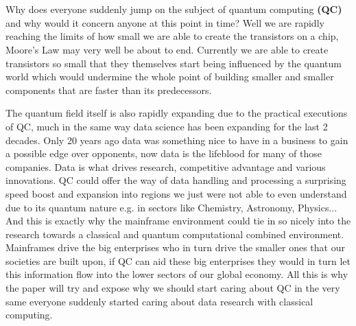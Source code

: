 
\chapter{}
\label{ch:inleiding}

Why does everyone suddenly jump on the subject of quantum computing \textbf{(QC)} and why would it concern anyone at this point in time? Well we are rapidly reaching the limits of how small we are able to create the transistors on a chip, Moore's Law may very well be about to end. Currently we are able to create transistors so small that they themselves start being influenced by the quantum world which would undermine the whole point of building smaller and smaller components that are faster than its predecessors. 

The quantum field itself is also rapidly expanding due to the practical executions of QC, much in the same way data science has been expanding for the last 2 decades. Only 20 years ago data was something nice to have in a business to gain a possible edge over opponents, now data is the lifeblood for many of those companies. Data is what drives research, competitive advantage and various innovations. QC could offer the way of data handling and processing a surprising speed boost and expansion into regions we just were not able to even understand due to its quantum nature e.g. in sectors like Chemistry, Astronomy, Physics...  And this is exactly why the mainframe environment could tie in so nicely into the research towards a classical and quantum computational combined environment. Mainframes drive the big enterprises who in turn drive the smaller ones that our societies are built upon, if QC can aid these big enterprises they would in turn let this information flow into the lower sectors of our global economy. All this is why the paper will try and expose why we should start caring about QC in the very same everyone suddenly started caring about data research with classical computing.~\autocite{Google2019} ~\autocite{IBM2019}


\section{}
\label{sec:probleemstelling}

